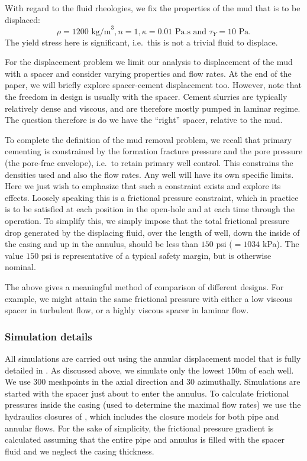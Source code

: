 \documentclass[review]{elsarticle}
\begin{document}
With regard to the fluid rheologies, we fix the properties of the mud that is to be displaced:
\begin{equation}\label{eq:mud_prop}
 \rho = 1200 \text{ kg/m}^3, n = 1,  \kappa = 0.01 \text{ Pa.s and }  \tau_{Y} =10\text{ Pa.}
\end{equation}
The yield stress here is significant, i.e.~this is not a trivial fluid to displace.

For the displacement problem we limit our analysis to displacement of the mud with a spacer and consider varying properties and flow rates. At the end of the paper, we will briefly explore spacer-cement displacement too. However, note that the freedom in design is usually with the spacer. Cement slurries are typically relatively dense and viscous, and are therefore mostly pumped in laminar regime. The question therefore is do we have the ``right'' spacer, relative to the mud.

To complete the definition  of the mud removal problem, we recall that primary cementing is constrained by the formation fracture pressure and the pore pressure (the pore-frac envelope), i.e.~to retain primary well control. This constrains the densities used and also the flow rates. Any well will have its own specific limits. Here we just wish to emphasize that such a constraint exists and explore its effects. Loosely speaking this is a frictional pressure constraint, which in practice is to be satisfied at each position in the open-hole and at each time through the operation. To simplify this, we simply impose that the total frictional pressure drop generated by the displacing fluid, over the length of well, down the inside of the casing and up in the annulus, should be less than $150$ psi ($=1034$ kPa). The value $150$ psi is representative of a typical safety margin, but is otherwise nominal.

The above gives a meaningful method of comparison of different designs. For example, we might attain the same frictional pressure with either a low viscous spacer in turbulent flow, or a highly viscous spacer in laminar flow.

\subsubsection{Simulation details}

All simulations are carried out using the annular displacement model that is fully detailed in \citet{Maleki2017}. As discussed above, we simulate only the lowest $150$m of each well. We use 300 meshpoints in the axial direction and 30 azimuthally. Simulations are started with the spacer just about to enter the annulus. To calculate frictional pressures inside the casing (used to determine the maximal flow rates) we use the hydraulics closures of \citet{Maleki2016}, which includes the closure models for both pipe and annular flows. For the sake of simplicity, the frictional pressure gradient is calculated assuming that the entire pipe and annulus is filled with the spacer fluid and we neglect the casing thickness.
\end{document}
